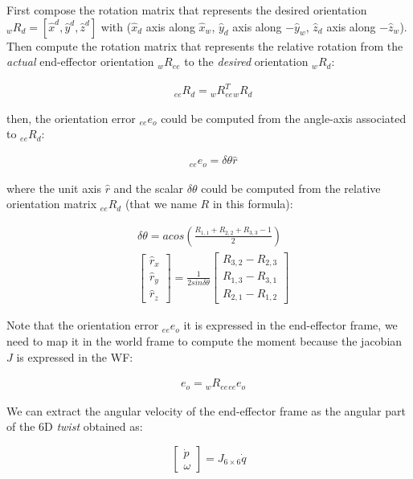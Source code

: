 \documentclass[11pt]{article}
\newcommand{\mat}[1]{\ensuremath{\begin{bmatrix}#1\end{bmatrix}}}	%
\begin{document}
First compose the rotation matrix that represents the desired orientation ${}_wR_d = [\hat{x}^d, \hat{y}^d, \hat{z}^d]$ with  ($\hat{x}_d$ axis along $\hat{x}_w$, $\hat{y}_d$ axis  along $-\hat{y}_w$, $\hat{z}_d$ axis along $-\hat{z}_w$).
Then compute the rotation matrix that represents the relative rotation from the \textit{actual} end-effector orientation ${}_wR_{ee}$ to the \textit{desired} orientation ${}_wR_d$:

\begin{align}
&{}_{ee}R_d = {}_wR_{ee}^T {}_wR_d
\end{align}

then, the orientation error ${}_{ee}e_o$ could be computed from the angle-axis associated to ${}_{ee}R_d$:


\begin{align}
& {}_{ee}e_o = \delta\theta \hat{r}
\end{align}

where the unit axis $\hat{r}$  and the scalar $\delta \theta$ could be computed from 
the relative orientation matrix ${}_{ee}R_d$ (that we name $R$ in this formula): 

\begin{align}
& \delta \theta = acos\left(\frac{R_{1,1} + R_{2,2} +R_{3,3} -1}{2}\right)\\
&\mat{\hat{r}_x \\ \hat{r}_y\\ \hat{r}_z} = \frac{1}{2sin \delta \theta} \mat{R_{3,2} - R_{2,3} \\R_{1,3} - R_{3,1}\\R_{2,1} - R_{1,2}}
\end{align}



Note that  the orientation error ${}_{ee}e_o$ it is expressed in the end-effector frame,
we need to map it in the world frame to compute the moment because the jacobian $J$ is expressed in the WF:

\begin{align}
&e_o = {}_wR_{ee} {}_{ee} e_o
\end{align}

We can extract the angular velocity of the end-effector frame as the angular part of the 6D \textit{twist} obtained as:

\begin{equation}
\mat{\dot{p}\\ \omega} = J_{6\times6} \dot{q}
\end{equation}
\end{document}
